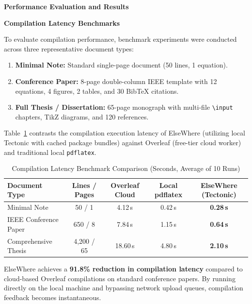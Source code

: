 \documentclass[12pt,a4paper,twoside]{article}
\newcommand{\numhead}[3]{%
  \begingroup\setlength{\parskip}{0pt}%
  \noindent\hspace*{0.25in}\makebox[0.25in][l]{\fontsize{18pt}{21.6pt}\selectfont\bfseries #1.}%
  {\fontsize{18pt}{21.6pt}\selectfont\bfseries #2}{\fontsize{18pt}{21.6pt}\selectfont #3}\par\nopagebreak
  \vspace{6pt}
  \endgroup}
\newcommand{\subhead}[2]{%
  \begingroup\setlength{\parskip}{0pt}\vspace{10pt}%
  \noindent\hspace*{0.25in}\makebox[0.35in][l]{\fontsize{13pt}{15.6pt}\selectfont\bfseries #1}%
  {\fontsize{13pt}{15.6pt}\selectfont\bfseries #2}\par\nopagebreak
  \vspace{4pt}
  \endgroup}
\newcommand{\code}[1]{\texttt{#1}}
\begin{document}
\newpage
\numhead{5}{Performance Evaluation and Results}{}

\subhead{5.1}{Compilation Latency Benchmarks}
To evaluate compilation performance, benchmark experiments were conducted across three representative document types:
\begin{enumerate}[leftmargin=0.5in,labelindent=0pt,labelwidth=0.25in,labelsep=0pt,
                  itemsep=2pt,parsep=0pt,topsep=2pt,partopsep=0pt,align=left]
    \item \textbf{Minimal Note:} Standard single-page document (50 lines, 1 equation).
    \item \textbf{Conference Paper:} 8-page double-column IEEE template with 12 equations, 4 figures, 2 tables, and 30 Bib\TeX{} citations.
    \item \textbf{Full Thesis / Dissertation:} 65-page monograph with multi-file \code{\textbackslash input} chapters, TikZ diagrams, and 120 references.
\end{enumerate}

Table~\ref{tab:compile_benchmarks} contrasts the compilation execution latency of ElseWhere (utilizing local Tectonic with cached package bundles) against Overleaf (free-tier cloud worker) and traditional local \code{pdflatex}.

\begin{table}[htbp]
\centering
\caption{Compilation Latency Benchmark Comparison (Seconds, Average of 10 Runs)}
\label{tab:compile_benchmarks}
\vspace{4pt}
\small
\renewcommand{\arraystretch}{1.3}
\begin{tabularx}{\textwidth}{>{\raggedright\arraybackslash}p{4.2cm}cccc}
\toprule
\textbf{Document Type} & \textbf{Lines / Pages} & \textbf{Overleaf Cloud} & \textbf{Local pdflatex} & \textbf{ElseWhere (Tectonic)} \\
\midrule
Minimal Note & 50 / 1 & 4.12\,s & 0.42\,s & \textbf{0.28\,s} \\
IEEE Conference Paper & 650 / 8 & 7.84\,s & 1.15\,s & \textbf{0.64\,s} \\
Comprehensive Thesis & 4,200 / 65 & 18.60\,s & 4.80\,s & \textbf{2.10\,s} \\
\bottomrule
\end{tabularx}
\end{table}

ElseWhere achieves a \textbf{91.8\% reduction in compilation latency} compared to cloud-based Overleaf compilations on standard conference papers. By running directly on the local machine and bypassing network upload queues, compilation feedback becomes instantaneous.
\end{document}
